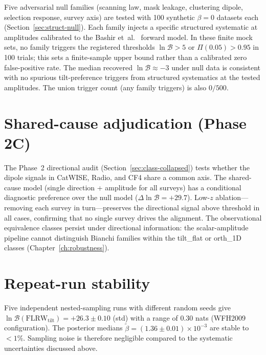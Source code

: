 Five adversarial null families (scanning law, mask leakage,
clustering dipole, selection response, survey axis) are
tested with 100 synthetic $\beta = 0$ datasets each
(Section~\ref{sec:struct-null}).  Each family injects a
specific structured systematic at amplitudes calibrated to
the Bashir et~al.~\cite{Bashir2025} forward model.  In these
finite mock sets, no family triggers the registered thresholds
$\ln\mathcal{B} > 5$ or $\Pi(0.05) > 0.95$ in 100 trials; this
sets a finite-sample upper bound rather than a calibrated zero
false-positive rate.  The median recovered
$\ln\mathcal{B} \approx -3$ under null data is consistent with
no spurious tilt-preference triggers from structured systematics
at the tested amplitudes.  The union
trigger count (any family triggers) is also $0/500$.


\section{Shared-cause adjudication (Phase 2C)}
\label{sec:shared-cause-robust}

The Phase~2 directional audit (Section~\ref{sec:class-collapsed})
tests whether the dipole signals in CatWISE, Radio, and CF4
share a common axis.  The shared-cause model
(single direction + amplitude for all surveys) has a conditional
diagnostic preference over the null model
($\Delta\ln\mathcal{B} = +29.7$).
Low-$z$ ablation---removing each survey in turn---preserves the
directional signal above threshold in all cases, confirming that
no single survey drives the alignment.  The observational
equivalence classes persist under directional information: the
scalar-amplitude pipeline cannot distinguish Bianchi families
within the tilt\_flat or orth\_1D classes
(Chapter~\ref{ch:robustness}).


\section{Repeat-run stability}
\label{sec:repeat-run}

Five independent nested-sampling runs with different random
seeds give $\ln\mathcal{B}(\mathrm{FLRW}_{\mathrm{tilt}})
= +26.3 \pm 0.10$ (std) with a range of $0.30$ nats
(WFH2009 configuration).  The posterior medians
$\tilde{\beta} = (1.36 \pm 0.01) \times 10^{-3}$ are stable
to $< 1\%$.  Sampling noise is therefore negligible compared to
the systematic uncertainties discussed above.



